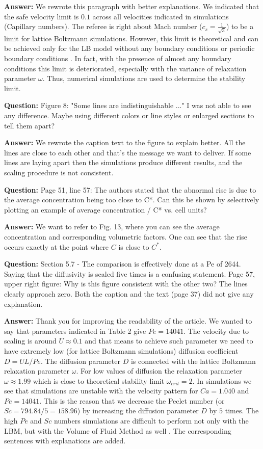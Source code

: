 \documentclass{article}
\begin{document}
\textbf{Answer:} We rewrote this paragraph with better explanations. We indicated that the safe velocity limit is $0.1$ across all velocities indicated in simulations (Capillary numbers). The referee is right about Mach number ($c_s=\frac{1}{\sqrt{3}}$) to be a limit for lattice Boltzmann simulations. However, this limit is theoretical and can be achieved only for the LB model without any boundary conditions or periodic boundary conditions \cite{kuzmin-stability-optimal}. In fact, with the presence of almost any boundary conditions this limit is deteriorated, especially with the variance of relaxation parameter $\omega$. Thus, numerical simulations are used to determine the stability limit. 

\textbf{Question:} Figure 8: "Some lines are indistinguishable ..." I was not able to see any difference. Maybe using different colors or line styles or enlarged sections to tell them apart?

\textbf{Answer:} We rewrote the caption text to the figure to explain better. All the lines are close to each other and that's the message we want to deliver. If some lines are laying apart then the simulations produce different results, and the scaling procedure is not consistent. 

\textbf{Question:} Page 51, line 57: The authors stated that the abnormal rise is due to the average concentration being too close to C*. Can this be shown by selectively plotting an example of average concentration / C* vs. cell units?

\textbf{Answer:} We want to refer to Fig. 13, where you can see the average concentration and corresponding volumetric factors. One can see that the rise occurs exactly at the point where $C$ is close to $C^{*}$.

\textbf{Question:} Section 5.7 - The comparison is effectively done at a Pe of 2644. Saying that the diffusivity is scaled five times is a confusing statement. Page 57, upper right figure: Why is this figure consistent with the other two? The lines clearly approach zero. Both the caption and the text (page 37) did not give any explanation.

\textbf{Answer:} Thank you for improving the readability of the article. We wanted to say that parameters indicated in Table 2  give $Pe=14041$. The velocity due to scaling is around $U\approx 0.1$ and that means to achieve such parameter we need to have extremely low (for lattice Boltzmann simulations) diffusion coefficient $D=U L / Pe$. The diffusion parameter $D$ is connected with the lattice Boltzmann relaxation parameter $\omega$. For low values of diffusion the relaxation parameter $\omega\approx 1.99$ which is close to theoretical stability limit $\omega_{crit}=2$. In simulations we see that simulations are unstable with the velocity pattern for $Ca=1.040$ and $Pe=14041$. This is the reason that we decrease the Peclet number (or $Sc=794.84/5=158.96$)  by increasing the diffusion parameter $D$ by $5$ times. The high $Pe$ and $Sc$ numbers simulations are difficult to perform not only with the LBM, but with the Volume of Fluid Method as well \cite{onea-mass}. The corresponding sentences with explanations are added. 
\end{document}
